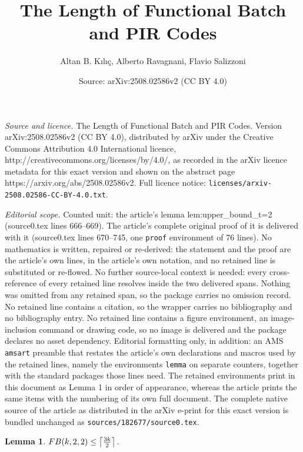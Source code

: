 \documentclass[10pt,a4paper]{amsart}
\title{The Length of Functional Batch and PIR Codes}
\author{Altan B. K\i l\i\c{c}, Alberto Ravagnani, Flavio Salizzoni}
\date{Source: arXiv:2508.02586v2 (CC BY 4.0)}
\newtheorem{lemma}{Lemma}
\newcommand{\fb}{\textnormal{FB}}
\begin{document}
\maketitle

\noindent\emph{Source and licence.} The Length of Functional Batch and PIR Codes. Version arXiv:2508.02586v2 (CC BY 4.0), distributed by arXiv under the Creative Commons Attribution 4.0 International licence, http://creativecommons.org/licenses/by/4.0/, as recorded in the arXiv licence metadata for this exact version and shown on the abstract page https://arxiv.org/abs/2508.02586v2. Full licence notice: \texttt{licenses/arxiv-2508.02586-CC-BY-4.0.txt}.\par\smallskip

\noindent\textit{Editorial scope.} Counted unit: the article's lemma lem:upper\_bound\_t=2 (source0.tex lines 666--669). The article's complete original proof of it is delivered with it (source0.tex lines 670--745, one \texttt{proof} environment of 76 lines). No mathematics is written, repaired or re-derived: the statement and the proof are the article's own lines, in the article's own notation, and no retained line is substituted or re-flowed.  No further source-local context is needed: every cross-reference of every retained line resolves inside the two delivered spans.  Nothing was omitted from any retained span, so the package carries no omission record.  No retained line contains a citation, so the wrapper carries no bibliography and no bibliography entry.  No retained line contains a figure environment, an image-inclusion command or drawing code, so no image is delivered and the package declares no asset dependency.  Editorial formatting only, in addition: an AMS \texttt{amsart} preamble that restates the article's own declarations and macros used by the retained lines, namely the environments \texttt{lemma} on separate counters, together with the standard packages those lines need.  The retained environments print in this document as Lemma 1 in order of appearance, whereas the article prints the same items with the numbering of its own full document.  The complete native source of the article as distributed in the arXiv e-print for this exact version is bundled unchanged as \texttt{sources/182677/source0.tex}.
\begin{lemma}
\label{lem:upper_bound_t=2}
$\fb(k,2,2) \le \left\lceil \frac{3k}{2} \right\rceil.$
\end{lemma}
\end{document}
